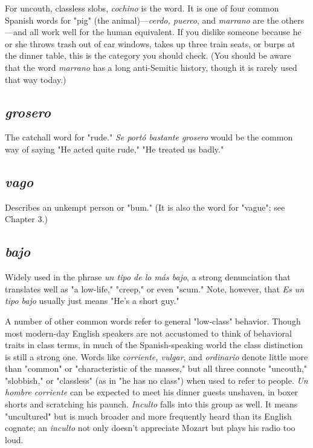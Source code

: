 \documentclass[14pt,a4paper,oneside]{memoir}
\newcommand{\bsk}{\vspace{20pt}}
\begin{document}
For uncouth, classless slobs, \emph{cochino} is the word. It is one of
four common Spanish words for "pig" (the animal)---\emph{cerdo, puerco},
and \emph{marrano} are the others---and all work well for the human equivalent. If you dislike someone because he or she throws trash out of car
windows, takes up three train seats, or burps at the dinner table, this is
the category you should check. (You should be aware that the word
\emph{marrano} has a long anti-Semitic history, though it is rarely used that
way today.)

\subsection{\emph{grosero}}

The catchall word for "rude." \emph{Se portó bastante
grosero} would be the common way of saying "He acted quite rude,"
"He treated us badly."

\subsection{\emph{vago}}

Describes an unkempt person or "bum." (It is also the
word for "vague"; see Chapter 3.)

\subsection{\emph{bajo}}

Widely used in the phrase \emph{un tipo de lo más bajo}, a
strong denunciation that translates well as "a low-life," "creep," or
even "scum." Note, however, that \emph{Es un tipo bajo} usually just means
"He's a short guy."

\bsk

A number of other common words refer to general "low-class"
behavior. Though most modern-day English speakers are not accustomed to think of behavioral traits in class terms, in much of the
Spanish-speaking world the class distinction is still a strong one.
Words like \emph{corriente, vulgar}, and \emph{ordinario} denote little more than
"common" or "characteristic of the masses," but all three connote
"uncouth," "slobbish," or "classless" (as in "he has no class") when
used to refer to people. \emph{Un hombre corriente} can be expected to meet
his dinner guests unshaven, in boxer shorts and scratching his paunch.
\emph{Inculto} falls into this group as well. It means "uncultured" but is
much broader and more frequently heard than its English cognate; an
\emph{inculto} not only doesn't appreciate Mozart but plays his radio too loud.
\end{document}
